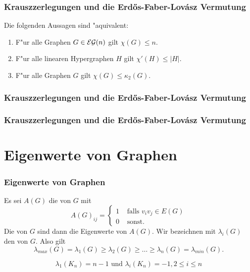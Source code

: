 \documentclass{beamer}
\begin{document}
  \begin{frame}[<+->]
    \frametitle{Krauszzerlegungen und die Erd\H os-Faber-Lov\'asz Vermutung}
    \begin{proposition}
      Die folgenden Aussagen sind "aquivalent:
      \begin{enumerate}[<+->]
        \item F"ur alle Graphen $G\in {\cal EG}(n)$ gilt $\chi(G) \leq n$.
        \item F"ur alle linearen Hypergraphen $H$ gilt $\chi'(H) \leq |H|$.
        \item F"ur alle Graphen $G$ gilt $\chi(G) \leq \kappa_{2}(G)$.
      \end{enumerate}
    \end{proposition}
  \end{frame}

  \begin{frame}
    \frametitle{Krauszzerlegungen und die Erd\H os-Faber-Lov\'asz Vermutung}
    
  \end{frame}
  \begin{frame}
    \frametitle{Krauszzerlegungen und die Erd\H os-Faber-Lov\'asz Vermutung}
    
  \end{frame}
  \section{Eigenwerte von Graphen}
  \begin{frame}[<+->]
    \frametitle{Eigenwerte von Graphen}
    Es sei $A(G)$ die  von $G$ mit 
    $$A(G)_{ij} = \begin{cases}
      1 & \text{ falls } v_iv_j \in E(G) \\
      0 & \text{ sonst.}
    \end{cases}$$
    \pause
    Die  von $G$ sind dann die Eigenwerte von $A(G)$. 
    \pause
    Wir bezeichnen mit $\lambda_{i}(G)$ den  von $G$. Also gilt 
    $$\lambda_{max}(G) = \lambda_{1}(G) \geq \lambda_{2}(G) \geq \dots \geq \lambda_{n}(G) = \lambda_{min}(G).$$
    \pause
    \begin{exmpl}
      $$\lambda_{1}(K_n) = n-1 \text{ und } \lambda_{i}(K_n) = -1, 2 \leq i \leq n$$
    \end{exmpl}
  \end{frame}
\end{document}
